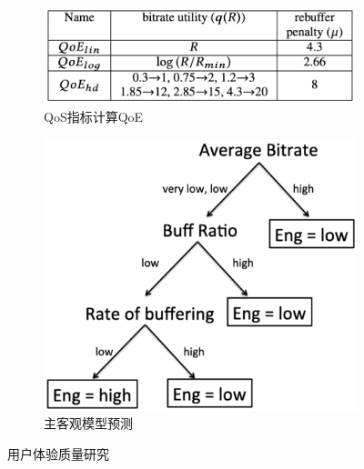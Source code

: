 \begin{figure}[ht]
\vspace{-0.5em} 
\begin{subfigure}[t]{0.48\linewidth} 
  \centering
  \includegraphics[height=0.2\textheight]{figures/chap02/qoe_related/QoS代替QoE.png} %
  \caption{QoS指标计算QoE}
\end{subfigure}%
\begin{subfigure}[t]{0.48\linewidth} 
  \centering
  \includegraphics[height=0.2\textheight]{figures/chap02/qoe_related/model.png} %
  \caption{主客观模型预测}
  \label{fig-chess-game}
\end{subfigure}
\vspace{-1em} %
\caption{用户体验质量研究}
\label{fig-qoe-re}
\end{figure}
